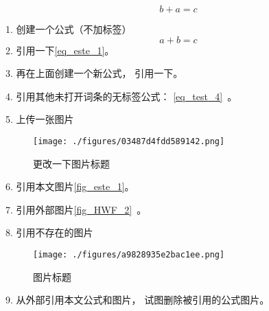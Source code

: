 

\begin{equation}\label{eq_este_2}
b + a = c
\end{equation}

1. 创建一个公式（不加标签）
\begin{equation}\label{eq_este_1}
a + b = c
\end{equation}
2. 引用一下\autoref{eq_este_1}。

3. 再在上面创建一个新公式， 引用一下。

4. 引用其他未打开词条的无标签公式： \autoref{eq_test_4}~。

5. 上传一张图片
\begin{figure}[ht]
\centering
\texttt{[image: ./figures/03487d4fdd589142.png]}
\caption{更改一下图片标题} \label{fig_este_1}
\end{figure}
6. 引用本文图片\autoref{fig_este_1}。

7. 引用外部图片\autoref{fig_HWF_2}~。

8. 引用不存在的图片

\begin{figure}[ht]
\centering
\texttt{[image: ./figures/a9828935e2bac1ee.png]}
\caption{图片标题} \label{fig_este_2}
\end{figure}

9. 从外部引用本文公式和图片， 试图删除被引用的公式图片。

